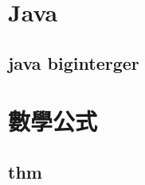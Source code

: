 \section{Java}
    \subsection{java biginterger}
        

\section{數學公式}
    \subsection{thm}
        
        
